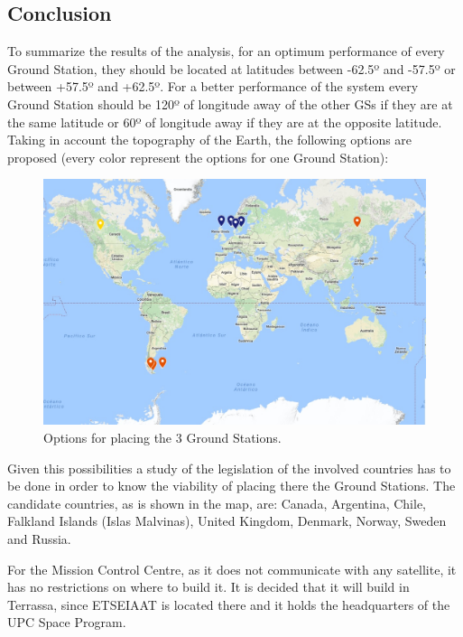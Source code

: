 \subsection{Conclusion}
To summarize the results of the analysis, for an optimum performance of every Ground Station, they should be located at latitudes between -62.5º and -57.5º or between +57.5º and +62.5º. For a better performance of the system every Ground Station should be 120º of longitude away of the other GSs if they are at the same latitude or 60º of longitude away if they are at the opposite latitude. Taking in account the topography of the Earth, the following options are proposed (every color represent the options for one Ground Station):
\begin{figure}[H]
\begin{center}
\includegraphics[scale=0.5]{Options.jpg}
\caption{Options for placing the 3 Ground Stations.}
\end{center}
\end{figure}

Given this possibilities a study of the legislation of the involved countries has to be done in order to know the viability of placing there the Ground Stations. The candidate countries, as is shown in the map, are: Canada, Argentina, Chile, Falkland Islands (Islas Malvinas), United Kingdom, Denmark, Norway, Sweden and Russia. 

For the Mission Control Centre, as it does not communicate with any satellite, it has no restrictions on where to build it. It is decided that it will build in Terrassa, since ETSEIAAT is located there and it holds the headquarters of the UPC Space Program.